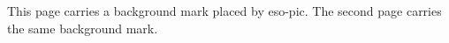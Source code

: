 \documentclass{article}
\begin{document}
This page carries a background mark placed by eso-pic.
\newpage
The second page carries the same background mark.
\end{document}
